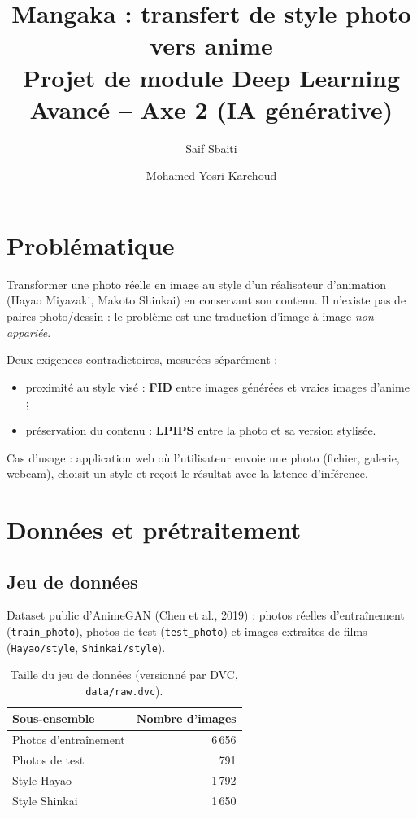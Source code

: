 \documentclass[11pt,a4paper]{article}
\title{Mangaka : transfert de style photo vers anime\\
  \large Projet de module Deep Learning Avancé -- Axe 2 (IA générative)}
\author{Saif Sbaiti \and Mohamed Yosri Karchoud}
\date{\AFAIRE{date de la soutenance}}
\begin{document}
\maketitle
\tableofcontents
\newpage

\section{Problématique}

Transformer une photo réelle en image au style d'un réalisateur d'animation (Hayao Miyazaki,
Makoto Shinkai) en conservant son contenu. Il n'existe pas de paires photo/dessin : le
problème est une traduction d'image à image \emph{non appariée}.

Deux exigences contradictoires, mesurées séparément :
\begin{itemize}
  \item proximité au style visé : \textbf{FID} entre images générées et vraies images d'anime ;
  \item préservation du contenu : \textbf{LPIPS} entre la photo et sa version stylisée.
\end{itemize}

Cas d'usage : application web où l'utilisateur envoie une photo (fichier, galerie, webcam),
choisit un style et reçoit le résultat avec la latence d'inférence.

\section{Données et prétraitement}

\subsection{Jeu de données}
Dataset public d'AnimeGAN (Chen et al., 2019) : photos réelles d'entraînement
(\texttt{train\_photo}), photos de test (\texttt{test\_photo}) et images extraites de films
(\texttt{Hayao/style}, \texttt{Shinkai/style}).

\begin{table}[h]
\centering
\begin{tabular}{lr}
\toprule
Sous-ensemble & Nombre d'images \\
\midrule
Photos d'entraînement & 6\,656 \\
Photos de test & 791 \\
Style Hayao & 1\,792 \\
Style Shinkai & 1\,650 \\
\bottomrule
\end{tabular}
\caption{Taille du jeu de données (versionné par DVC, \texttt{data/raw.dvc}).}
\end{table}
\end{document}
